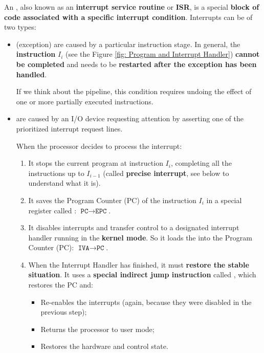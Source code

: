 \noindent
An , also known as an \textbf{interrupt service routine} or \textbf{ISR}, is a special \textbf{block of code associated with a specific interrupt condition}. Interrupts can be of two types:
\begin{itemize}
    \item {} (exception) are caused by a particular instruction stage. In general, the \textbf{instruction} $I_{i}$ (see the Figure \ref{fig: Program and Interrupt Handler}) \textbf{cannot be completed} and needs to be \textbf{restarted after the exception has been handled}.
    
    If we think about the pipeline, this condition requires undoing the effect of one or more partially executed instructions.


    \item {} are caused by an I/O device requesting attention by asserting one of the prioritized interrupt request lines.
    
    When the processor decides to process the interrupt:
    \begin{enumerate}
        \item It stops the current program at instruction $I_{i}$, completing all the instructions up to $I_{i-1}$ (called \textbf{precise interrupt}, see below to understand what it is).
        
        \item It saves the Program Counter (PC) of the instruction $I_{i}$ in a special register called : $\texttt{PC} \rightarrow \texttt{EPC}$.
        
        \item It disables interrupts and transfer control to a designated interrupt handler running in the \textbf{kernel mode}. So it loads the  into the Program Counter (PC): $\texttt{IVA} \rightarrow \texttt{PC}$.
        
        \newpage

        \item When the Interrupt Handler has finished, it must \textbf{restore the stable situation}. It uses a \textbf{special indirect jump instruction} called , which restores the PC and:
        \begin{itemize}
            \item Re-enables the interrupts (again, because they were disabled in the previous step);
            
            \item Returns the processor to user mode;
            
            \item Restores the hardware and control state.
        \end{itemize}
    \end{enumerate}
\end{itemize}

